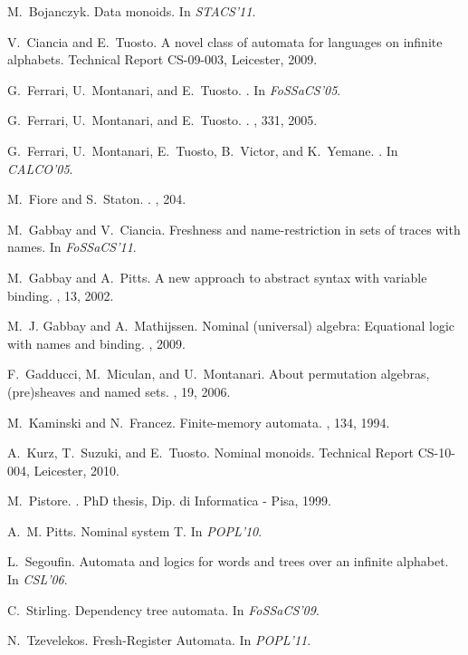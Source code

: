 \documentclass[runningheads,a4paper]{llncs}
\begin{document}

\begin{thebibliography}{10}

M.~Bojanczyk.
\newblock Data monoids.
\newblock In {\em STACS'11}.

V.~Ciancia and E.~Tuosto.
\newblock A novel class of automata for languages on infinite alphabets.
\newblock Technical Report CS-09-003, Leicester, 2009.

G.~Ferrari, U.~Montanari, and E.~Tuosto.
.
\newblock In {\em FoSSaCS'05}.

G.~Ferrari, U.~Montanari, and E.~Tuosto.
.
, 331, 2005.

G.~Ferrari, U.~Montanari, E.~Tuosto, B.~Victor, and K.~Yemane.
.
\newblock In {\em CALCO'05}.

M.~Fiore and S.~Staton.
.
, 204.

M.~Gabbay and V.~Ciancia.
\newblock Freshness and name-restriction in sets of traces with names.
\newblock In {\em FoSSaCS'11}.

M.~Gabbay and A.~Pitts.
\newblock A new approach to abstract syntax with variable binding.
, 13, 2002.

M.~J. Gabbay and A.~Mathijssen.
\newblock Nominal (universal) algebra: Equational logic with names and binding.
, 2009.

F.~Gadducci, M.~Miculan, and U.~Montanari.
\newblock About permutation algebras, (pre)sheaves and named sets.
, 19, 2006.

M.~Kaminski and N.~Francez.
\newblock Finite-memory automata.
, 134, 1994.

A.~Kurz, T.~Suzuki, and E.~Tuosto.
\newblock Nominal monoids.
\newblock Technical Report CS-10-004, Leicester, 2010.

M.~Pistore.
.
\newblock PhD thesis, Dip. di Informatica - Pisa, 1999.

A.~M. Pitts.
\newblock Nominal system {T}.
\newblock In {\em POPL'10}.

L.~Segoufin.
\newblock Automata and logics for words and trees over an infinite alphabet.
\newblock In {\em CSL'06}.

C.~Stirling.
\newblock Dependency tree automata.
\newblock In {\em FoSSaCS'09}.

N.~Tzevelekos.
\newblock Fresh-{R}egister {A}utomata.
\newblock In {\em POPL'11}.

\end{thebibliography}
\end{document}
